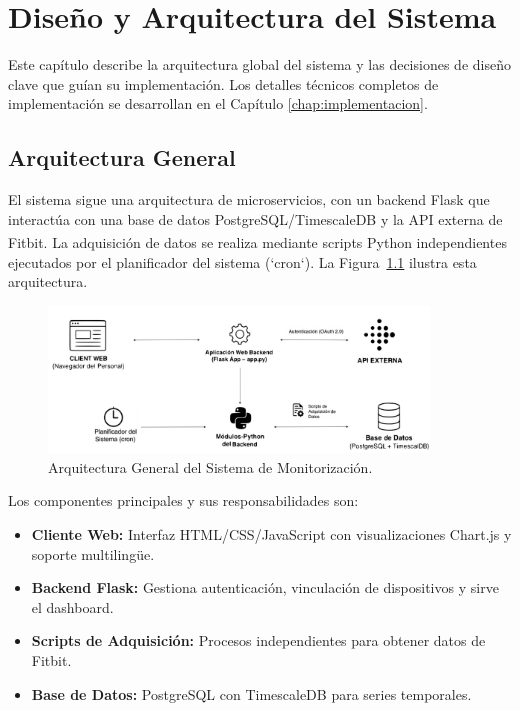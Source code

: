 
\chapter{Diseño y Arquitectura del Sistema}
\label{chap:diseno_arquitectura} 

Este capítulo describe la arquitectura global del sistema y las decisiones de diseño clave que guían su implementación. Los detalles técnicos completos de implementación se desarrollan en el Capítulo \ref{chap:implementacion}.

\section{Arquitectura General}
\label{sec:arquitectura_general}

El sistema sigue una arquitectura de microservicios, con un backend Flask que interactúa con una base de datos PostgreSQL/TimescaleDB y la API externa de Fitbit\textsuperscript{\textregistered}. La adquisición de datos se realiza mediante scripts Python independientes ejecutados por el planificador del sistema (`cron`). La Figura~\ref{fig:arquitectura_general} ilustra esta arquitectura.

\begin{figure}[htbp] 
    \centering
    \includegraphics[width=0.9\textwidth]{imagenes/arquitectura_general.png}
    \caption{Arquitectura General del Sistema de Monitorización.}
    \label{fig:arquitectura_general}
\end{figure}

Los componentes principales y sus responsabilidades son:

\begin{itemize}
    \item \textbf{Cliente Web:} Interfaz HTML/CSS/JavaScript con visualizaciones Chart.js y soporte multilingüe.
    \item \textbf{Backend Flask:} Gestiona autenticación, vinculación de dispositivos y sirve el dashboard.
    \item \textbf{Scripts de Adquisición:} Procesos independientes para obtener datos de Fitbit.
    \item \textbf{Base de Datos:} PostgreSQL con TimescaleDB para series temporales.
\end{itemize}

